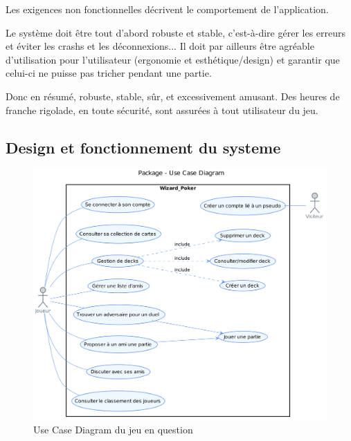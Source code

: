 \documentclass[11pt,a4paper]{article}
\begin{document}
Les exigences non fonctionnelles décrivent le comportement de l'application.

Le système doit être tout d'abord robuste et stable, c'est-à-dire gérer les erreurs et éviter les crashs et les déconnexions... Il doit par ailleurs être agréable d'utilisation pour l'utilisateur (ergonomie et esthétique/design) et garantir que celui-ci ne puisse pas tricher pendant une partie.

Donc en résumé, robuste, stable, sûr, et excessivement amusant. Des heures de franche rigolade, en toute sécurité, sont assurées à tout utilisateur du jeu.

\subsection{Design et fonctionnement du systeme}
\label{sec:design}


\begin{figure}[ht]
  \centering
  \includegraphics[width=1\textwidth]{uml_files/UseCaseDiagram.png}
  \caption{\label{fig:usecase} Use Case Diagram du jeu en question}
\end{figure}
\end{document}
